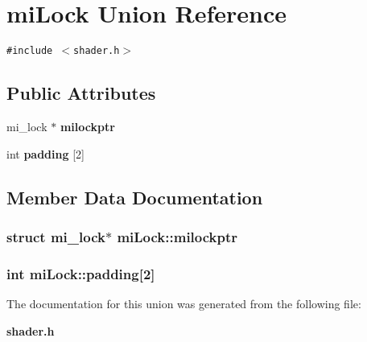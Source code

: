 \section{mi\-Lock Union Reference}
\label{unionmiLock}
{\tt \#include $<$shader.h$>$}

\subsection*{Public Attributes}
\begin{CompactItemize}
\item 
mi\_\-lock $\ast$ {\bf milockptr}
\item 
int {\bf padding} [2]
\end{CompactItemize}


\subsection{Member Data Documentation}
\subsubsection{\setlength{\rightskip}{0pt plus 5cm}struct mi\_\-lock$\ast$ {\bf mi\-Lock::milockptr}}\label{unionmiLock_o0}


\subsubsection{\setlength{\rightskip}{0pt plus 5cm}int {\bf mi\-Lock::padding}[2]}\label{unionmiLock_o1}




The documentation for this union was generated from the following file:\begin{CompactItemize}
\item 
{\bf shader.h}\end{CompactItemize}
